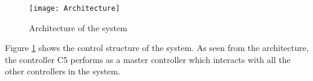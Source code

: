 \begin{figure}[h]
\center
\texttt{[image: Architecture]}
\caption{Architecture of the system}
\label{fig:architecture}
\end{figure}

Figure \ref{fig:architecture} shows the control structure of the system. As seen from the architecture, the controller C5 performs as a master controller which interacts with all the other controllers in the system. 

